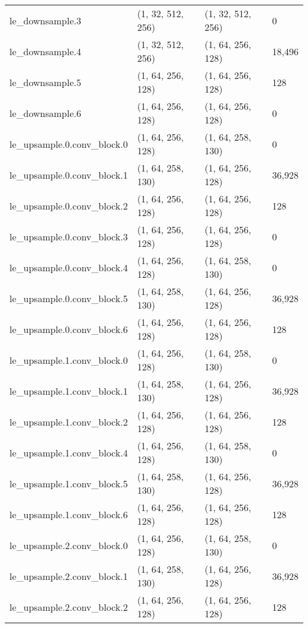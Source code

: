 \begin{longtable}{llll}
                    le\_downsample.3 &  (1, 32, 512, 256) &  (1, 32, 512, 256) &           0 \\
                    le\_downsample.4 &  (1, 32, 512, 256) &  (1, 64, 256, 128) &      18,496 \\
                    le\_downsample.5 &  (1, 64, 256, 128) &  (1, 64, 256, 128) &         128 \\
                    le\_downsample.6 &  (1, 64, 256, 128) &  (1, 64, 256, 128) &           0 \\
        le\_upsample.0.conv\_block.0 &  (1, 64, 256, 128) &  (1, 64, 258, 130) &           0 \\
        le\_upsample.0.conv\_block.1 &  (1, 64, 258, 130) &  (1, 64, 256, 128) &      36,928 \\
        le\_upsample.0.conv\_block.2 &  (1, 64, 256, 128) &  (1, 64, 256, 128) &         128 \\
        le\_upsample.0.conv\_block.3 &  (1, 64, 256, 128) &  (1, 64, 256, 128) &           0 \\
        le\_upsample.0.conv\_block.4 &  (1, 64, 256, 128) &  (1, 64, 258, 130) &           0 \\
        le\_upsample.0.conv\_block.5 &  (1, 64, 258, 130) &  (1, 64, 256, 128) &      36,928 \\
        le\_upsample.0.conv\_block.6 &  (1, 64, 256, 128) &  (1, 64, 256, 128) &         128 \\
        le\_upsample.1.conv\_block.0 &  (1, 64, 256, 128) &  (1, 64, 258, 130) &           0 \\
        le\_upsample.1.conv\_block.1 &  (1, 64, 258, 130) &  (1, 64, 256, 128) &      36,928 \\
        le\_upsample.1.conv\_block.2 &  (1, 64, 256, 128) &  (1, 64, 256, 128) &         128 \\
        le\_upsample.1.conv\_block.4 &  (1, 64, 256, 128) &  (1, 64, 258, 130) &           0 \\
        le\_upsample.1.conv\_block.5 &  (1, 64, 258, 130) &  (1, 64, 256, 128) &      36,928 \\
        le\_upsample.1.conv\_block.6 &  (1, 64, 256, 128) &  (1, 64, 256, 128) &         128 \\
        le\_upsample.2.conv\_block.0 &  (1, 64, 256, 128) &  (1, 64, 258, 130) &           0 \\
        le\_upsample.2.conv\_block.1 &  (1, 64, 258, 130) &  (1, 64, 256, 128) &      36,928 \\
        le\_upsample.2.conv\_block.2 &  (1, 64, 256, 128) &  (1, 64, 256, 128) &         128 \\

\end{longtable}
